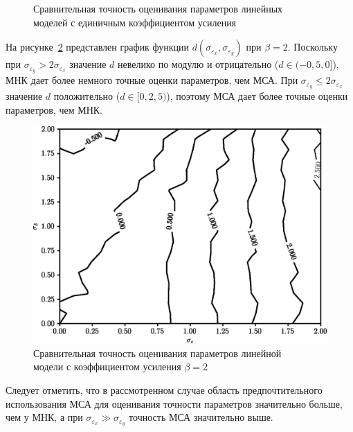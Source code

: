 \begin{figure}[p]
  \vspace{\baselineskip}
  \caption{%
    Сравнительная точность оценивания параметров линейных \\
    моделей с единичным коэффициентом усиления
  }\label{fig:comparison_linear_params_beta-1}
\end{figure}

\pagebreak
На рисунке~\ref{fig:comparison_linear_params_beta-2}
представлен график функции \( d(\sigma_{\varepsilon_x}, \sigma_{\varepsilon_y}) \)
при \( \beta = 2 \).
Поскольку при \( \sigma_{\varepsilon_y} > 2 \sigma_{\varepsilon_x} \)
значение \( d \) невелико по модулю и отрицательно (\( d \in ( -0{,}5, 0 ] \)),
МНК дает более немного точные оценки параметров, чем МСА.
При \( \sigma_{\varepsilon_y} \le 2\sigma_{\varepsilon_x} \)
значение \( d \) положительно (\( d \in [0, 2{,}5 ) \)),
поэтому МСА дает более точные оценки параметров, чем МНК.

\begin{figure}[h]
  \centering
  \includegraphics[width=135mm]{fig/linear/param/beta-2_param.png}
  \caption{%
    Сравнительная точность оценивания параметров линейной \\
    модели с коэффициентом усиления \( \beta = 2 \)
  }\label{fig:comparison_linear_params_beta-2}
\end{figure}

Следует отметить, что в рассмотренном случае область предпочтительного использования
МСА для оценивания точности параметров значительно больше, чем у МНК,
а при \( \sigma_{\varepsilon_x} \gg \sigma_{\varepsilon_y} \) точность МСА значительно выше.

